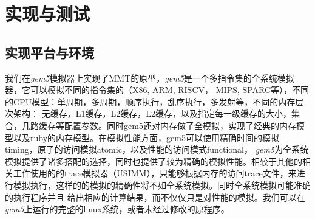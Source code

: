 \chapter{实现与测试}

\section{实现平台与环境}
我们在\emph{gem5}模拟器上实现了MMT的原型，\emph{gem5}是一个多指令集的全系统模拟器，它可以模拟不同的指令集的（X86, ARM, RISCV， MIPS, SPARC等），不同的CPU模型：单周期，多周期，顺序执行，乱序执行，多发射等，不同的内存层次架构：
无缓存，L1缓存，L2缓存，L2缓存，以及指定每一级缓存的大小，集合，几路缓存等配置参数。同时gem5还对内存做了全模拟，实现了经典的内存模型以及ruby的内存模型。在模拟性能方面，gem5可以使用精确时间的模拟timing，原子的访问模拟atomic，以及性能的访问模式functional，
\emph{gem5}为全系统模拟提供了诸多搭配的选择，同时也提供了较为精确的模拟性能。相较于其他的相关工作使用的的trace模拟器（USIMM），只能够根据内存的访问trace文件，来进行模拟执行，这样的的模拟的精确性将不如全系统模拟。同时全系统模拟可能准确的执行程序并且
给出相应的计算结果，而不仅仅只是对性能的模拟。我们可以在\emph{gem5}上运行的完整的linux系统，或者未经过修改的原程序。
